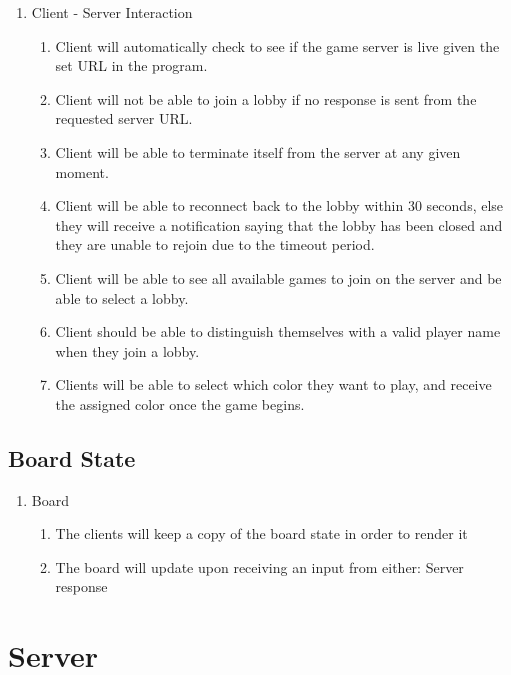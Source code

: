 \documentclass{scrreprt}
\begin{document}
\begin{enumerate}[label*=R\arabic*.]
    \item Client - Server Interaction
    \begin{enumerate}[label*=\arabic*.]
        \item Client will automatically check to see if the game server is live given the set URL in the program.
        \item Client will not be able to join a lobby if no response is sent from the requested server URL.
        \item Client will be able to terminate itself from the server at any given moment.
        \item Client will be able to reconnect back to the lobby within 30 seconds, else they will receive a notification saying that the lobby has been closed and they are unable to rejoin due to the timeout period.
        \item Client will be able to see all available games to join on the server and be able to select a lobby.
        \item Client should be able to distinguish themselves with a valid player name when they join a lobby.
        \item Clients will be able to select which color they want to play, and receive the assigned color once the game begins.
    \end{enumerate}
\end{enumerate}

\subsection{Board State}

\begin{enumerate}[resume*]
    \item Board
    \begin{enumerate}[label*=\arabic*.]
        \item The clients will keep a copy of the board state in order to render it
        \item The board will update upon receiving an input from either:
            \subitem Server response
    \end{enumerate}
\end{enumerate}

\section{Server}
\end{document}
